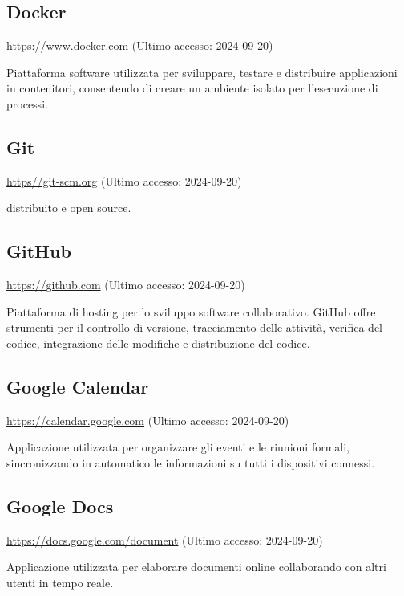 \subsection{Docker}
\par \href{https://www.docker.com}{https://www.docker.com} (Ultimo accesso: 2024-09-20)
\par Piattaforma software utilizzata per sviluppare, testare e distribuire applicazioni in contenitori, consentendo di creare un ambiente isolato per l'esecuzione di processi.

\subsection{Git}
\par \href{https://git-scm.org}{https//git-scm.org} (Ultimo accesso: 2024-09-20)
\par {} distribuito e open source.

\subsection{GitHub}
\par \href{https://github.com}{https://github.com} (Ultimo accesso: 2024-09-20)
\par Piattaforma di hosting per lo sviluppo software collaborativo. GitHub offre strumenti per il controllo di versione, tracciamento delle attività, verifica del codice, integrazione delle modifiche e distribuzione del codice.
    
\subsection{Google Calendar}
\par \href{https://calendar.google.com}{https://calendar.google.com} (Ultimo accesso: 2024-09-20)
\par Applicazione utilizzata per organizzare gli eventi e le riunioni formali, sincronizzando in automatico le informazioni su tutti i dispositivi connessi.
    
\subsection{Google Docs}
\par \href{https://docs.google.com/document}{https://docs.google.com/document} (Ultimo accesso: 2024-09-20)
\par Applicazione utilizzata per elaborare documenti online collaborando con altri utenti in tempo reale.

